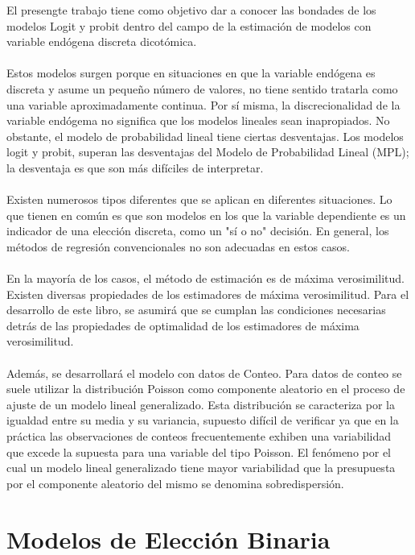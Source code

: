 \documentclass[11pt,fleqn]{book} %
\numberwithin{equation}{section} %
\numberwithin{figure}{section} %
\numberwithin{table}{section} %
\begin{document}
El presengte trabajo tiene como objetivo dar a conocer las bondades de los modelos Logit y probit dentro del campo de la estimación de modelos con variable endógena discreta dicotómica. 
\\\\
Estos modelos surgen porque en situaciones en que la variable endógena es discreta y asume un pequeño número de valores, no tiene sentido tratarla como una variable aproximadamente continua. Por sí misma, la discrecionalidad de la variable endógema no significa que los modelos lineales sean inapropiados. No obstante, el modelo de probabilidad lineal tiene ciertas desventajas. Los modelos logit y probit, superan las desventajas del Modelo de Probabilidad Lineal (MPL); la desventaja es que son más difíciles de interpretar.
\\\\
Existen numerosos tipos diferentes que se aplican en diferentes situaciones. Lo que tienen en común es que son modelos en los que la variable dependiente es un indicador de una elección discreta, como un "sí o no" decisión. En general, los métodos de regresión convencionales no son adecuadas en estos casos.
\\\\
En la mayoría de los casos, el método de estimación es de máxima verosimilitud. Existen diversas propiedades de los estimadores de máxima verosimilitud. Para el desarrollo de este libro, se asumirá que se cumplan las condiciones necesarias detrás de las propiedades de optimalidad de los estimadores de máxima verosimilitud.
\\\\
Además, se desarrollará el modelo con datos de Conteo. Para datos de conteo se suele utilizar la distribución Poisson como componente aleatorio en el proceso de ajuste de un modelo lineal generalizado. Esta distribución se caracteriza por la igualdad entre su media y su variancia, supuesto difícil de verificar ya que en la práctica
las observaciones de conteos frecuentemente exhiben una variabilidad que excede la supuesta para una variable del tipo Poisson. El fenómeno por el cual un modelo lineal generalizado
tiene mayor variabilidad que la presupuesta por el componente aleatorio del mismo se denomina sobredispersión. 



\chapter{Modelos de Elección Binaria}
\end{document}
